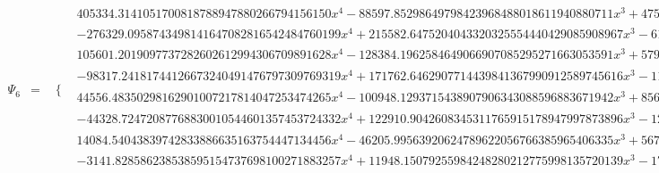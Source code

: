 \documentclass{article}
\begin{document}
\begin{landscape}
\begin{eqnarray*}
\begin{array}{cc}
\end{array}\\
\Psi_6 & = & \begin{array}{cc}
 \{ & 
\begin{array}{cc}
 405334.3141051700818788947880266794156150 x^4-88597.85298649798423968488018611940880711 x^3+4758.633152740334951401815567947534051450 x^2-12.52946083772011068530491053409048208449 x-0.1728575573820139277186280106256140459031 & x\geq 0\land x<\frac{1}{8} \\
 -276329.0958743498141647082816542484760199 x^4+215582.6475204043320325554440429085908967 x^3-61664.05327863663504828272053357612153365 x^2+7660.176576210475501815212898493385081471 x-349.0874457986536710944115801287529668510 & x\geq \frac{1}{8}\land x<\frac{1}{4} \\
 105601.2019097737282602612994306709891628 x^4-128384.1962584649066907085295271663053591 x^3+57950.61308060270615342907749021171044979 x^2-11524.01700637893423998928988681895443620 x+853.6110107218392067031889006320460067292 & x\geq \frac{1}{4}\land x<\frac{3}{8} \\
 -98317.24181744126673240491476797309769319 x^4+171762.6462907714439841367990912589745616 x^3-112131.6315497632941782798593958514417244 x^2+32427.26398964589357410756932435673179911 x-3505.792981351880637717967284300368014907 & x\geq \frac{3}{8}\land x<\frac{1}{2} \\
 44556.48350298162901007217814047253474265 x^4-100948.1293715438907906343088596883671942 x^3+85679.03327249912820069758957354742209169 x^2-32287.18174609147559503009513605444191805 x+4558.002806214184215048072890646068581883 & x\geq \frac{1}{2}\land x<\frac{5}{8} \\
 -44328.72472087768830010544601357453724332 x^4+122910.9042608345311765915178947997873896 x^3-127589.5556599835669192216099947599677632 x^2+58765.71053768104462274647468435058298386 x-10132.29027165488029032353626197936466366 & x\geq \frac{5}{8}\land x<\frac{3}{4} \\
 14084.54043839742833886635163754447134456 x^4-46205.99563920624789622056766385965406335 x^3+56787.35277268117188914195360792978553753 x^2-30987.26848627400823269338487570956650736 x+6334.302968965305068844782126062839275074 & x\geq \frac{3}{4}\land x<\frac{7}{8} \\
 -3141.828586238538595154737698100271883257 x^4+11948.15079255984248280212775998135720139 x^3-17024.87023553947778113740281274496949629 x^2+10772.60243835358249448737313794695492145 x-2554.054409135408600997360387083070743288 & x\geq \frac{7}{8}\land x<1 \\

\end{array}
\end{array}
\end{eqnarray*}
\end{landscape}
\end{document}
